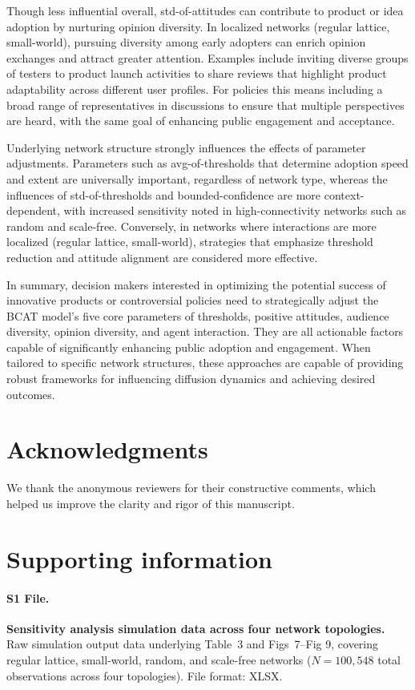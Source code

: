 \documentclass[10pt,letterpaper]{article}
\begin{document}
Though less influential overall, std-of-attitudes can contribute to product or idea adoption by nurturing opinion diversity. In localized networks (regular lattice, small-world), pursuing diversity among early adopters can enrich opinion exchanges and attract greater attention. Examples include inviting diverse groups of testers to product launch activities to share reviews that highlight product adaptability across different user profiles. For policies this means including a broad range of representatives in discussions to ensure that multiple perspectives are heard, with the same goal of enhancing public engagement and acceptance.

Underlying network structure strongly influences the effects of parameter adjustments. Parameters such as avg-of-thresholds that determine adoption speed and extent are universally important, regardless of network type, whereas the influences of std-of-thresholds and bounded-confidence are more context-dependent, with increased sensitivity noted in high-connectivity networks such as random and scale-free. Conversely, in networks where interactions are more localized (regular lattice, small-world), strategies that emphasize threshold reduction and attitude alignment are considered more effective.

In summary, decision makers interested in optimizing the potential success of innovative products or controversial policies need to strategically adjust the BCAT model's five core parameters of thresholds, positive attitudes, audience diversity, opinion diversity, and agent interaction. They are all actionable factors capable of significantly enhancing public adoption and engagement. When tailored to specific network structures, these approaches are capable of providing robust frameworks for influencing diffusion dynamics and achieving desired outcomes.

\section*{Acknowledgments}

We thank the anonymous reviewers for their constructive comments, which helped us improve the clarity and rigor of this manuscript.


\section*{Supporting information}

\paragraph*{S1 File.}
\label{S1_File}
{\bf Sensitivity analysis simulation data across four network topologies.} Raw simulation output data underlying Table~3 and Figs~7--Fig 9, covering regular lattice, small-world, random, and scale-free networks ($N = 100{,}548$ total observations across four topologies). File format: XLSX.
\end{document}
